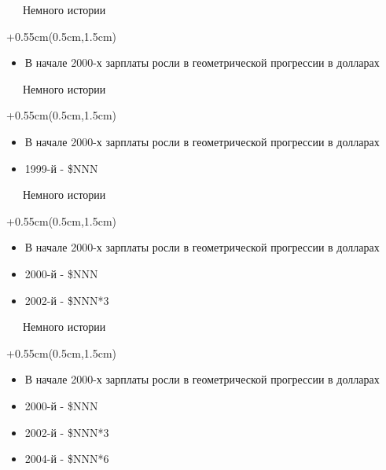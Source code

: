 \documentclass[xetex,18pt,aspectratio=169]{beamer}
\begin{document}
\begin{Large}
\begin{frame}{\ \ \ Немного истории}
\begin{textblock*}{\framewidth+0.55cm}(0.5cm,1.5cm)
\begin{itemize}
  \item В начале 2000-х зарплаты росли в геометрической прогрессии в долларах
\end{itemize}
\end{textblock*}
\end{frame}

\begin{frame}{\ \ \ Немного истории}
\begin{textblock*}{\framewidth+0.55cm}(0.5cm,1.5cm)
\begin{itemize}
  \item В начале 2000-х зарплаты росли в геометрической прогрессии в долларах
  \item 1999-й - \$NNN
\end{itemize}
\end{textblock*}
\end{frame}

\begin{frame}{\ \ \ Немного истории}
\begin{textblock*}{\framewidth+0.55cm}(0.5cm,1.5cm)
\begin{itemize}
  \item В начале 2000-х зарплаты росли в геометрической прогрессии в долларах
  \item 2000-й - \$NNN
  \item 2002-й - \$NNN*3
\end{itemize}
\end{textblock*}
\end{frame}

\begin{frame}{\ \ \ Немного истории}
\begin{textblock*}{\framewidth+0.55cm}(0.5cm,1.5cm)
\begin{itemize}
  \item В начале 2000-х зарплаты росли в геометрической прогрессии в долларах
  \item 2000-й - \$NNN
  \item 2002-й - \$NNN*3
  \item 2004-й - \$NNN*6
\end{itemize}
\end{textblock*}
\end{frame}


\end{Large}
\end{document}
